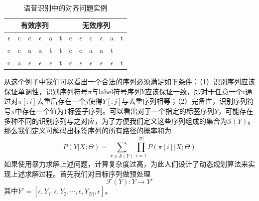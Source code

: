 \documentclass[twoside,a4paper,12pt]{book}%
\begin{document}
\begin{table} [h]
	\begin{center}
		\begin{tabular}{cccccc|cccccc}
			\hline
			\multicolumn{6}{c|}{有效序列}&\multicolumn{6}{|c}{无效序列}\\    
			\hline
			$\epsilon$ & c & c & $\epsilon$ & a & t & c &$\epsilon$&c&$\epsilon$&a&t\\
			 c & c & a & a & t & t & c & c & a & a & t &\\
			c & a & $\epsilon$ & $\epsilon$ & $\epsilon$ & t & c &$\epsilon$&$\epsilon$&$\epsilon$&$\epsilon$&t\\
			\hline
		\end{tabular}
		\caption{语音识别中的对齐问题实例}  \label{tab:mfcc2}
	\end{center}
\end{table}  
从这个例子中我们可以看出一个合法的序列必须满足如下条件：（1）识别序列应该保证单调性，识别序列符号$\pi$与label符号序列$Y$应该保证一致，即对于任意一个$i$通过对$\pi[:i]$去重后存在一个$j$使得$Y[:j]$与去重序列相等；（2）完备性，识别序列符号$\pi$中存在一个值为$Y$标签子序列。可以看出对于一个指定的标签序列$Y$，可能存在多种不同的识别序列与之对应，为了方便我们定义这些序列组成的集合为$\mathcal{S}(Y)$。那么我们定义可解码出标签序列的所有路径的概率和为
$$
P(Y|X;\Theta) = \sum_{ \pi \in \mathcal{S}(Y) }{\prod_{i=1}^{|\pi|}{P(\pi [i]|X;\Theta)}}
$$
如果使用暴力求解上述问题，计算复杂度过高，为此人们设计了动态规划算法来实现上述求解过程。首先我们对目标序列做预处理
$$
\mathscr{F}(Y):Y \rightarrow Y'
$$
其中$Y'=[\epsilon,Y_1,\epsilon,Y_2,\cdots,\epsilon,Y_{|Y|},\epsilon]$。
\end{document}
